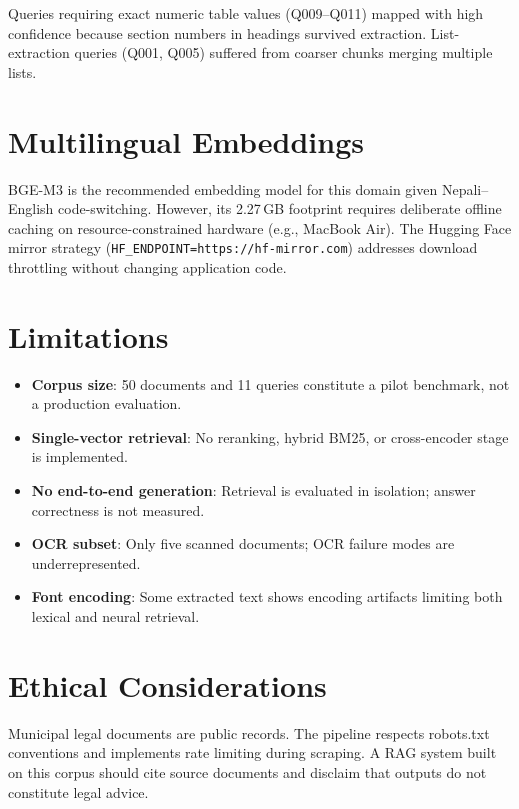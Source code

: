 Queries requiring exact numeric table values (Q009--Q011) mapped with high confidence because section numbers in headings survived extraction. List-extraction queries (Q001, Q005) suffered from coarser chunks merging multiple lists.

\section{Multilingual Embeddings}
BGE-M3 is the recommended embedding model for this domain given Nepali--English code-switching. However, its 2.27\,GB footprint requires deliberate offline caching on resource-constrained hardware (e.g., MacBook Air). The Hugging Face mirror strategy (\texttt{HF\_ENDPOINT=https://hf-mirror.com}) addresses download throttling without changing application code.

\section{Limitations}
\begin{itemize}[leftmargin=*]
  \item \textbf{Corpus size}: 50 documents and 11 queries constitute a pilot benchmark, not a production evaluation.
  \item \textbf{Single-vector retrieval}: No reranking, hybrid BM25, or cross-encoder stage is implemented.
  \item \textbf{No end-to-end generation}: Retrieval is evaluated in isolation; answer correctness is not measured.
  \item \textbf{OCR subset}: Only five scanned documents; OCR failure modes are underrepresented.
  \item \textbf{Font encoding}: Some extracted text shows encoding artifacts limiting both lexical and neural retrieval.
\end{itemize}

\section{Ethical Considerations}
Municipal legal documents are public records. The pipeline respects robots.txt conventions and implements rate limiting during scraping. A RAG system built on this corpus should cite source documents and disclaim that outputs do not constitute legal advice.
